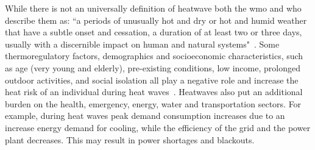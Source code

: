 While there is not an universally definition of heatwave both the \ac{wmo} and \ac{who} describe them as: ``a periods of unusually hot and dry or hot and humid weather that have a subtle onset and cessation, a duration of at least two or three days, usually with a discernible impact on human and natural systems"~\cite{WMO2015}.
Some thermoregulatory factors, demographics and socioeconomic characteristics, such as age (very young and elderly), pre-existing conditions, low income, prolonged outdoor activities, and social isolation all play a negative role and increase the heat risk of an individual during heat waves~\cite{WMO2015}.
Heatwaves also put an additional burden on the health, emergency, energy, water and transportation sectors.
For example, during heat waves peak demand consumption increases due to an increase energy demand for cooling, while the efficiency of the grid and the power plant decreases.
This may result in power shortages and blackouts.

